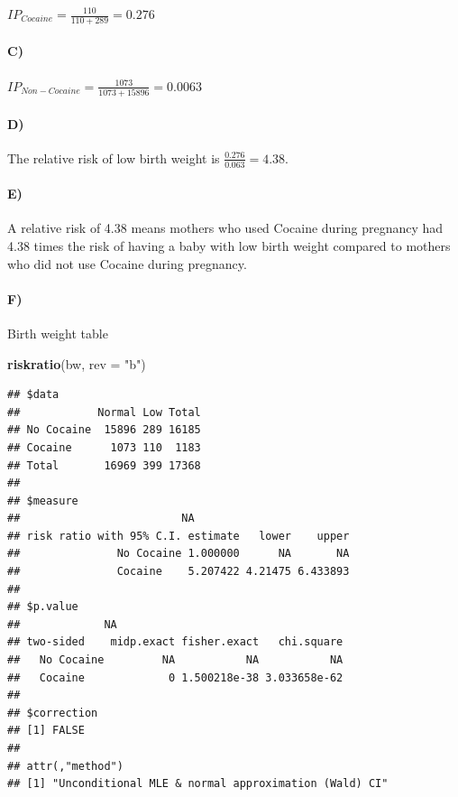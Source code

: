\documentclass[
]{article}
\newenvironment{Shaded}{\begin{snugshade}}{\end{snugshade}}
\newcommand{\AttributeTok}[1]{\textcolor[rgb]{0.13,0.29,0.53}{#1}}
\newcommand{\FunctionTok}[1]{\textcolor[rgb]{0.13,0.29,0.53}{\textbf{#1}}}
\newcommand{\NormalTok}[1]{#1}
\newcommand{\StringTok}[1]{\textcolor[rgb]{0.31,0.60,0.02}{#1}}
\begin{document}
\(IP_{Cocaine} = \frac{110}{110+289} = 0.276\)

\paragraph{C)}\label{c}

\(IP_{Non-Cocaine} = \frac{1073}{1073+15896} = 0.0063\)

\paragraph{D)}\label{d}

The relative risk of low birth weight is \(\frac{0.276}{0.063} = 4.38\).

\paragraph{E)}\label{e}

A relative risk of 4.38 means mothers who used Cocaine during pregnancy
had 4.38 times the risk of having a baby with low birth weight compared
to mothers who did not use Cocaine during pregnancy.

\paragraph{F)}\label{f}

Birth weight table

\begin{Shaded}
\begin{Highlighting}[]
\FunctionTok{riskratio}\NormalTok{(bw, }\AttributeTok{rev =} \StringTok{"b"}\NormalTok{)}
\end{Highlighting}
\end{Shaded}

\begin{verbatim}
## $data
##            Normal Low Total
## No Cocaine  15896 289 16185
## Cocaine      1073 110  1183
## Total       16969 399 17368
## 
## $measure
##                         NA
## risk ratio with 95% C.I. estimate   lower    upper
##               No Cocaine 1.000000      NA       NA
##               Cocaine    5.207422 4.21475 6.433893
## 
## $p.value
##             NA
## two-sided    midp.exact fisher.exact   chi.square
##   No Cocaine         NA           NA           NA
##   Cocaine             0 1.500218e-38 3.033658e-62
## 
## $correction
## [1] FALSE
## 
## attr(,"method")
## [1] "Unconditional MLE & normal approximation (Wald) CI"
\end{verbatim}
\end{document}
